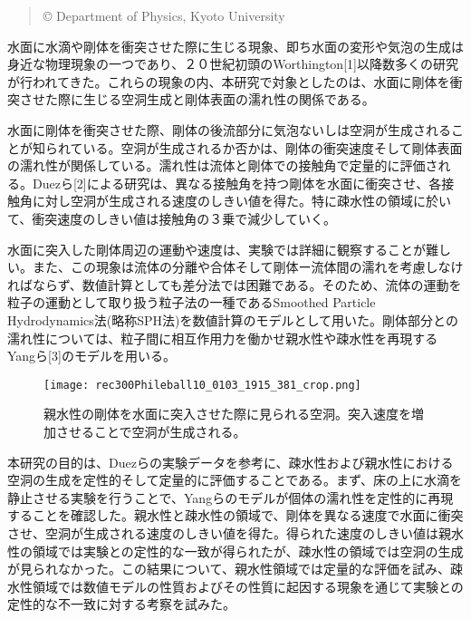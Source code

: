 \documentclass[a4paper]{jsarticle}
\begin{document}
\begin{center}
\begin{abstract}
{%
\hspace{-4pt}
{\fontsize{10.5pt}{12.6pt}\selectfont \copyright}
{\fontsize{10.5pt}{12.6pt} Department of Physics, Kyoto University}
}
\end{abstract}
\end{center}
\vspace{5pt}
{\fontsize{10.5pt}{14pt}\selectfont 

 水面に水滴や剛体を衝突させた際に生じる現象、即ち水面の変形や気泡の生成は身近な物理現象の一つであり、２０世紀初頭のWorthington[1]以降数多くの研究が行われてきた。これらの現象の内、本研究で対象としたのは、水面に剛体を衝突させた際に生じる空洞生成と剛体表面の濡れ性の関係である。

 水面に剛体を衝突させた際、剛体の後流部分に気泡ないしは空洞が生成されることが知られている。空洞が生成されるか否かは、剛体の衝突速度そして剛体表面の濡れ性が関係している。濡れ性は流体と剛体での接触角で定量的に評価される。Duezら[2]による研究は、異なる接触角を持つ剛体を水面に衝突させ、各接触角に対し空洞が生成される速度のしきい値を得た。特に疎水性の領域に於いて、衝突速度のしきい値は接触角の３乗で減少していく。

 水面に突入した剛体周辺の運動や速度は、実験では詳細に観察することが難しい。また、この現象は流体の分離や合体そして剛体ー流体間の濡れを考慮しなければならず、数値計算としても差分法では困難である。そのため、流体の運動を粒子の運動として取り扱う粒子法の一種であるSmoothed Particle Hydrodynamics法(略称SPH法)を数値計算のモデルとして用いた。剛体部分との濡れ性については、粒子間に相互作用力を働かせ親水性や疎水性を再現するYangら[3]のモデルを用いる。

 \begin{figure}[h]
   \begin{center}
     \texttt{[image: rec300Phileball10\_0103\_1915\_381\_crop.png]}
     \caption{親水性の剛体を水面に突入させた際に見られる空洞。突入速度を増加させることで空洞が生成される。}
   \end{center}
 \end{figure}

 本研究の目的は、Duezらの実験データを参考に、疎水性および親水性における空洞の生成を定性的そして定量的に評価することである。まず、床の上に水滴を静止させる実験を行うことで、Yangらのモデルが個体の濡れ性を定性的に再現することを確認した。親水性と疎水性の領域で、剛体を異なる速度で水面に衝突させ、空洞が生成される速度のしきい値を得た。得られた速度のしきい値は親水性の領域では実験との定性的な一致が得られたが、疎水性の領域では空洞の生成が見られなかった。この結果について、親水性領域では定量的な評価を試み、疎水性領域では数値モデルの性質およびその性質に起因する現象を通じて実験との定性的な不一致に対する考察を試みた。

}
\end{document}
